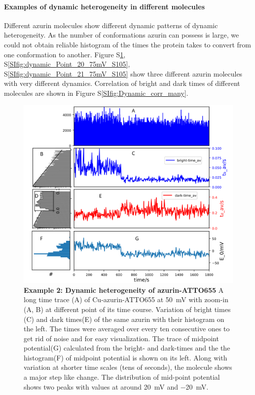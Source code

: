 \paragraph*{Examples of dynamic heterogeneity in different molecules}
Different azurin molecules show different dynamic patterns of dynamic heterogeneity.
As the number of conformations azurin can possess is large, we could not obtain reliable histogram of the times the protein takes to convert from one conformation to another.
Figure S\ref{SIfig:dynamic_trace_steps}, S\ref{SIfig:dynamic_Point_20_75mV_S105}, S\ref{SIfig:dynamic_Point_21_75mV_S105} show three different azurin molecules with very different dynamics.
Correlation of bright and dark times of  different molecules are shown in Figure S\ref{SIfig:Dynamic_corr_many}.

\begin{figure}[ht]
  \centering
  \includegraphics[width=\textwidth]{dynamic_trace_steps}
  \makeatletter
  \renewcommand{\fnum@figure}{\figurename~S\thefigure}
  \makeatother
  \caption{\textbf{Example 2: Dynamic heterogeneity of azurin-ATTO655}
  A long time trace (A) of Cu-azurin-ATTO655 at \SI{50}{\mV} with zoom-in (A, B) at different point of its time course.
  Variation of bright times (C) and dark times(E) of the same azurin with their histogram on the left.
  The times were averaged over every ten consecutive ones to get rid of noise and for easy visualization.
  The trace of midpoint potential(G) calculated from the bright- and dark-times and the the histogram(F) of midpoint potential is shown on its left.
  Along with variation at shorter time scales (tens of seconds), the molecule shows a major step like change.
  The distribution of mid-point potential shows two peaks with values at around \SI{20}{\mV} and \SI{-20}{\mV}.
  }
  \label{SIfig:dynamic_trace_steps}
\end{figure}

